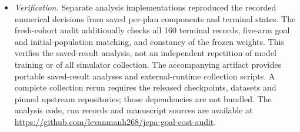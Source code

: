 \begin{itemize}[leftmargin=*,itemsep=1pt]
  computed after the outcomes and are descriptive.
\item \emph{Verification.} Separate analysis implementations reproduced the recorded numerical decisions from saved per-plan
  components and terminal states. The fresh-cohort audit additionally checks all 160 terminal records, five-arm goal
  and initial-population matching, and constancy of the frozen weights. This verifies the saved-result
  analysis, not an independent repetition of model training or of all simulator collection. The accompanying artifact provides portable saved-result analyses and external-runtime collection
  scripts. A complete collection rerun requires the released checkpoints, datasets and pinned upstream repositories;
  those dependencies are not bundled. The analysis code, run records and manuscript sources are available at
  \url{https://github.com/levanmanh268/jepa-goal-cost-audit}.
\end{itemize}
